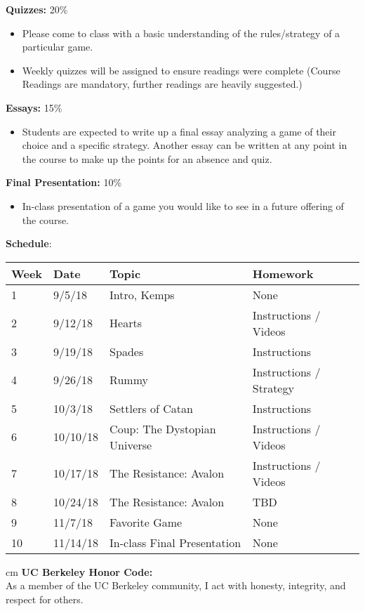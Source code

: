 \documentclass[11.5pt]{article}
\begin{document}
\begin{description}
\item \textbf{Quizzes:} 20\% 
\end{description}

\begin{itemize}
\item Please come to class with a basic understanding of the rules/strategy of a
particular game. 
\item Weekly quizzes will be assigned to ensure readings were complete (Course
Readings are mandatory, further readings are heavily suggested.)
\end{itemize}

\begin{description}
\item \textbf{Essays:} 15\% 
\end{description}

\begin{itemize}
\item Students are expected to write up a final essay analyzing a game of their choice and a specific strategy. Another essay can be written at any point in the course to make up the points for an absence and quiz.
\end{itemize}

\begin{description}
\item \textbf{Final Presentation:} 10\% 
\end{description}

\begin{itemize}
\item In-class presentation of a game you would like to see in a future offering of the course.
\end{itemize}
\newpage

\noindent\textbf{\large Schedule}: \vspace*{0.05cm}
\flushleft
\begin{tabular}{ |p{0.8cm}||p{3cm}|p{7cm}|p{4cm}|  }
 \hline
 Week & Date & Topic & Homework \\
 \hline
1  & 9/5/18 & Intro, Kemps & None \\ \hline
2 &  9/12/18  & Hearts & Instructions / Videos \\ \hline
3 & 9/19/18 & Spades & Instructions \\ \hline
4 & 9/26/18  & Rummy & Instructions / Strategy \\ \hline
5 & 10/3/18 & Settlers of Catan & Instructions \\ \hline
6 & 10/10/18 & Coup: The Dystopian Universe & Instructions / Videos \\ \hline
7 & 10/17/18 & The Resistance: Avalon & Instructions / Videos \\ \hline
8 & 10/24/18 & The Resistance: Avalon & TBD \\ \hline
9 & 11/7/18 & Favorite Game & None \\ \hline
10 & 11/14/18 & In-class Final Presentation & None \\
\hline
\end{tabular}
 cm
\noindent\textbf{UC Berkeley Honor Code:} \\
As a member of the UC Berkeley community, I act with honesty, integrity, and respect for others.
\end{document}

